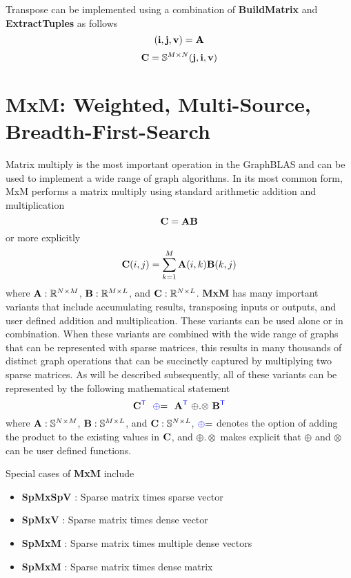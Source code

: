 Transpose can be implemented using a combination of {\bf BuildMatrix} and {\bf ExtractTuples} as follows
$$
	({\bf i},{\bf j},{\bf v}) = {\bf A}
$$
$$
   \mathbf{C} = \mathbb{S}^{M \times N}({\bf j},{\bf i},{\bf v})
$$

  
\section{MxM: Weighted, Multi-Source, Breadth-First-Search}

Matrix multiply is the most important operation in the GraphBLAS and can be used to implement a wide range of graph algorithms.  In its most common form, MxM performs a matrix multiply using standard arithmetic addition and multiplication
$$
   {\bf C} = {\bf A} {\bf B}
$$
or more explicitly
$$
   {\bf C}(i,j) = \sum_{k=1}^M {\bf A}(i,k) {\bf B}(k,j)
$$
where ${\bf A}: \mathbb{R}^{N \times M}$,  ${\bf B}: \mathbb{R}^{M \times L}$, and ${\bf C}: \mathbb{R}^{N \times L}$. {\bf MxM} has many important variants that include accumulating results, transposing inputs or outputs, and user defined addition and multiplication.  These variants can be used alone or in combination.  When these variants are combined with the wide range of graphs that can be represented with sparse matrices, this results in many thousands of distinct graph operations that can be succinctly captured by multiplying two sparse matrices.   As will be described subsequently, all of these variants can be represented by the following mathematical statement
$$
   {\bf C}^{\textcolor{blue}{\sf T}} ~~ {\textcolor{blue}{\oplus}}{=} ~~ {\bf A}^{\textcolor{blue}{\sf T}} ~ {\oplus}.{\otimes} ~ {\bf B}^{\textcolor{blue}{\sf T}}
$$
where  ${\bf A}: \mathbb{S}^{N \times M}$,  ${\bf B}: \mathbb{S}^{M \times L}$, and ${\bf C}: \mathbb{S}^{N \times L}$, ${\textcolor{blue}{\oplus}}{=}$ denotes the option of adding the product to the existing values in ${\bf C}$, and ${\oplus}.{\otimes}$ makes explicit that ${\oplus}$ and ${\otimes}$ can be user defined functions.

Special cases of {\bf MxM} include
\begin{itemize}
\item  {\bf SpMxSpV} : Sparse matrix times sparse vector
\item  {\bf SpMxV} : Sparse matrix times dense vector
\item {\bf SpMxM} : Sparse matrix times multiple dense vectors
\item {\bf SpMxM} : Sparse matrix times dense matrix
\end{itemize}

